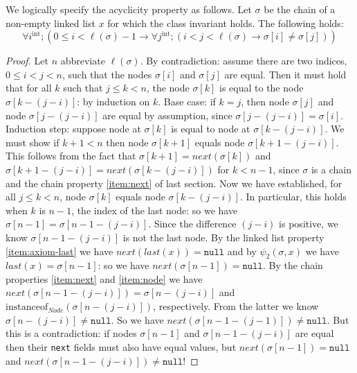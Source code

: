 \documentclass[runningheads]{llncs}
\begin{document}
We logically specify the acyclicity property as follows. Let $\sigma$ be the chain of a non-empty linked list $x$ for which the class invariant holds. The following holds:
$$
\forall i^\mathrm{int}; (0\leq i<\ell(\sigma)-1\to \forall j^\mathrm{int}; (i < j < \ell(\sigma)\to \sigma[i]\neq\sigma[j]))
$$

\begin{proof}
Let $n$ abbreviate $\ell(\sigma)$. By contradiction: assume there are two indices, $0\leq i<j<n$, such that the nodes $\sigma[i]$ and $\sigma[j]$ are equal.
Then it must hold that for all $k$ such that $j \leq k < n$, the node $\sigma[k]$ is equal to the node $\sigma[k-(j-i)]$:
by induction on $k$.
Base case: if $k = j$, then node $\sigma[j]$ and node $\sigma[j-(j-i)]$ are equal by assumption, since $\sigma[j-(j-i)]=\sigma[i]$.
Induction step: suppose node at $\sigma[k]$ is equal to node at $\sigma[k-(j-i)]$.
We must show if $k+1<n$ then node $\sigma[k+1]$ equals node $\sigma[k+1-(j-i)]$.
This follows from the fact that $\sigma[k+1] = \mathit{next}(\sigma[k])$ and $\sigma[k+1-(j-i)] = \mathit{next}(\sigma[k-(j-i)])$ for $k<n-1$, since $\sigma$ is a chain and the chain property \ref{item:next} of last section.
Now we have established, for all $j \leq k < n$, node $\sigma[k]$ equals node $\sigma[k-(j-i)]$.
In particular, this holds when $k$ is $n-1$, the index of the last node:
so we have $\sigma[n-1] = \sigma[n-1-(j-i)]$.
Since the difference $(j-i)$ is positive, we know $\sigma[n-1-(j-i)]$ is not the last node.
By the linked list property \ref{item:axiom-last} we have $\mathit{next}(\mathit{last}(x))=\mathtt{null}$
and by $\psi_2(\sigma,x)$ we have $\mathit{last}(x)=\sigma[n-1]$:
so we have $\mathit{next}(\sigma[n-1])=\mathtt{null}$.
By the chain properties \ref{item:next} and \ref{item:node} we have $\mathit{next}(\sigma[n-1-(j-i)])=\sigma[n-(j-i)]$
and $\mathrm{instanceof}_\mathit{Node}(\sigma[n-(j-i)])$, respectively.
From the latter we know $\sigma[n-(j-i)]\neq\mathtt{null}$.
So we have $\mathit{next}(\sigma[n-1-(j-1)])\neq\mathtt{null}$.
But this is a contradiction: if nodes $\sigma[n-1]$ and $\sigma[n-1-(j-i)]$ are equal then their \texttt{next} fields must also have equal values, but $\mathit{next}(\sigma[n-1])=\mathtt{null}$ and $\mathit{next}(\sigma[n-1-(j-i)])\neq\mathtt{null}$!
\end{proof}


\end{document}
